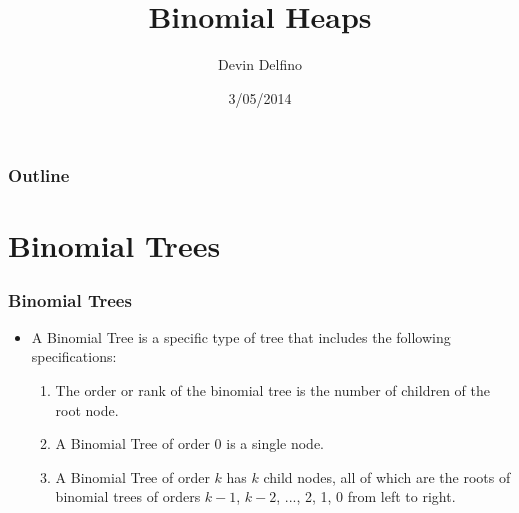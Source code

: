 \documentclass[13pt]{beamer}
\title{Binomial Heaps}
\author{Devin Delfino}
\institute{Comp 401: Senior Seminar}
\date{3/05/2014}
\begin{document}
\frame{\titlepage}


\begin{frame}
\frametitle{Outline}
\tableofcontents
\end{frame}

\section{Binomial Trees} %
\begin{frame}
\frametitle{Binomial Trees}
	\begin{itemize}
		\item A \alert{Binomial Tree} is a specific type of tree that includes the following specifications:
          \begin{enumerate}
            \item The \alert{order} or \alert{rank} of the binomial tree is the number of children of the root node.
            \item A Binomial Tree of order $0$ is a single node.
            \item A Binomial Tree of order $k$ has $k$ child nodes, all of which are the roots of binomial trees of orders $k - 1$, $k - 2$, ..., 2, 1, 0 from left to right.
          \end{enumerate}
	\end{itemize}
\end{frame}
\end{document}
